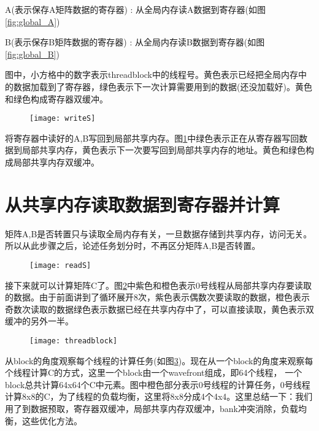 A(表示保存A矩阵数据的寄存器) : 从全局内存读A数据到寄存器(如图\ref{fig:global_A})

B(表示保存B矩阵数据的寄存器) : 从全局内存读B数据到寄存器(如图\ref{fig:global_B})

图中，小方格中的数字表示threadblock中的线程号。黄色表示已经把全局内存中的数据加载到了寄存器，绿色表示下一次计算需要用到的数据(还没加载好)。黄色和绿色构成寄存器双缓冲。

\begin{figure}[htbp]
	\centering
	\texttt{[image: writeS]}
	\label{fig:writeS}
\end{figure}

将寄存器中读好的A,B写回到局部共享内存。图\ref{fig:writeS}中绿色表示正在从寄存器写回数据到局部共享内存，黄色表示下一次要写回到局部共享内存的地址。黄色和绿色构成局部共享内存双缓冲。


\section{从共享内存读取数据到寄存器并计算}
矩阵A,B是否转置只与读取全局内存有关，一旦数据存储到共享内存，访问无关。所以从此步骤之后，论述任务划分时，不再区分矩阵A,B是否转置。
\begin{figure}[htbp]
	\centering
	\texttt{[image: readS]}
	\label{fig:readS}
\end{figure}

接下来就可以计算矩阵C了。图\ref{fig:readS}中紫色和橙色表示0号线程从局部共享内存要读取的数据。由于前面讲到了循环展开8次，紫色表示偶数次要读取的数据，橙色表示奇数次读取的数据绿色表示数据已经在共享内存中了，可以直接读取，黄色表示双缓冲的另外一半。

\begin{figure}[htbp]
	\centering
	\texttt{[image: threadblock]}
	\label{fig:threadblock}
\end{figure}

从block的角度观察每个线程的计算任务(如图\ref{fig:threadblock})。现在从一个block的角度来观察每个线程计算C的方式，这里一个block由一个wavefront组成，即64个线程， 一个block总共计算64x64个C中元素。图中橙色部分表示0号线程的计算任务，0号线程计算8x8的C，为了线程的负载均衡，这里将8x8分成4个4x4。这里总结一下：我们用了到数据预取，寄存器双缓冲，局部共享内存双缓冲，bank冲突消除，负载均衡，这些优化方法。


